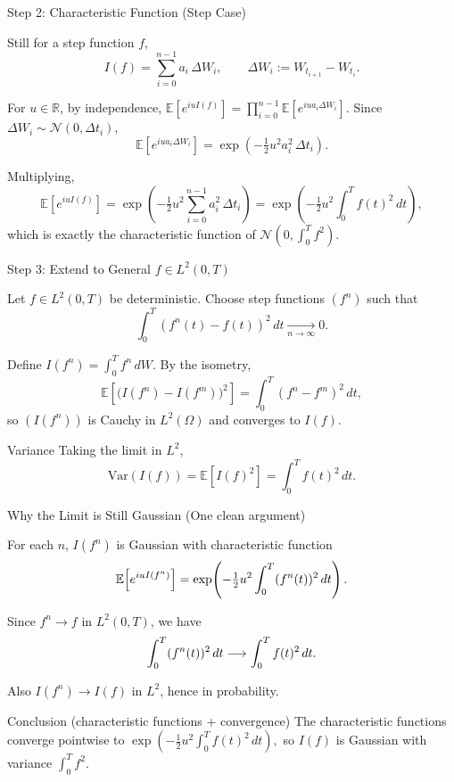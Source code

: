 \documentclass[10pt,aspectratio=169]{beamer}
\newcommand{\R}{\mathbb{R}}
\newcommand{\E}{\mathbb{E}}
\newcommand{\Var}{\text{Var}}
\begin{document}
\begin{frame}{Step 2: Characteristic Function (Step Case)}

Still for a step function $f$,
\[
I(f)=\sum_{i=0}^{n-1} a_i\,\Delta W_i,
\qquad \Delta W_i:=W_{t_{i+1}}-W_{t_i}.
\]
\pause

For $u\in\R$, by independence,
$
\E\!\left[e^{iu I(f)}\right]
=
\prod_{i=0}^{n-1}\E\!\left[e^{iu a_i \Delta W_i}\right].
$
Since $\Delta W_i\sim \mathcal{N}(0,\Delta t_i)$,
\[
\E\!\left[e^{iu a_i \Delta W_i}\right]
=
\exp\!\left(-\tfrac12 u^2 a_i^2\,\Delta t_i\right).
\]
\pause

Multiplying,
\[
\E\!\left[e^{iu I(f)}\right]
=
\exp\!\left(-\tfrac12 u^2 \sum_{i=0}^{n-1} a_i^2\,\Delta t_i\right)
=
\exp\!\left(-\tfrac12 u^2 \int_0^T f(t)^2\,dt\right),
\]
which is exactly the characteristic function of
$\mathcal{N}\!\left(0,\int_0^T f^2\right)$.

\end{frame}

\begin{frame}{Step 3: Extend to General $f\in L^2(0,T)$}

Let $f\in L^2(0,T)$ be deterministic. Choose step functions $(f^n)$ such that
\[
\int_0^T (f^n(t)-f(t))^2\,dt \xrightarrow[n\to\infty]{} 0.
\]
\pause

Define $I(f^n)=\int_0^T f^n\,dW$. By the isometry,
\[
\E\!\left[\big(I(f^n)-I(f^m)\big)^2\right]
=
\int_0^T (f^n-f^m)^2\,dt,
\]
so $(I(f^n))$ is Cauchy in $L^2(\Omega)$ and converges to $I(f)$.\pause

\medskip
\begin{block}{Variance}
Taking the limit in $L^2$,
\[
\Var(I(f))=\E[I(f)^2]=\int_0^T f(t)^2\,dt.
\]
\end{block}

\end{frame}

\begin{frame}{Why the Limit is Still Gaussian (One clean argument)}

For each $n$, $I(f^n)$ is Gaussian with characteristic function
\vspace{-1mm}
\[
\E\!\left[e^{iu I(f^n)}\right]
=
\exp\!\left(-\tfrac12 u^2 \int_0^T (f^n(t))^2\,dt\right).
\vspace{-3mm}
\]
\pause

Since $f^n\to f$ in $L^2(0,T)$, we have
\[
\int_0^T (f^n(t))^2\,dt \longrightarrow \int_0^T f(t)^2\,dt.
\vspace{-3mm}\]
\pause

Also $I(f^n)\to I(f)$ in $L^2$, hence in probability.\pause

\medskip
\begin{block}{Conclusion (characteristic functions + convergence)}
The characteristic functions converge pointwise to
$
\exp\!\left(-\tfrac12 u^2 \int_0^T f(t)^2\,dt\right),
$
so $I(f)$ is Gaussian with variance $\int_0^T f^2$.
\end{block}

\end{frame}
\end{document}
